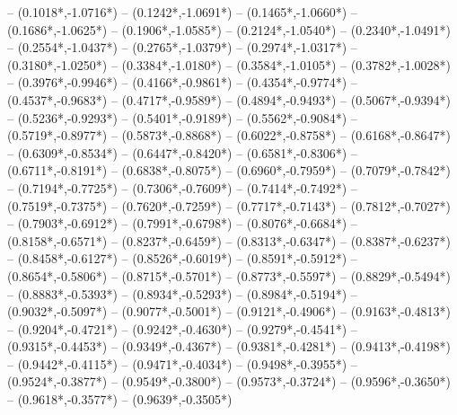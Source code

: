 {	-- ({0.1018*\dx},{-1.0716*\dy})
	-- ({0.1242*\dx},{-1.0691*\dy})
	-- ({0.1465*\dx},{-1.0660*\dy})
	-- ({0.1686*\dx},{-1.0625*\dy})
	-- ({0.1906*\dx},{-1.0585*\dy})
	-- ({0.2124*\dx},{-1.0540*\dy})
	-- ({0.2340*\dx},{-1.0491*\dy})
	-- ({0.2554*\dx},{-1.0437*\dy})
	-- ({0.2765*\dx},{-1.0379*\dy})
	-- ({0.2974*\dx},{-1.0317*\dy})
	-- ({0.3180*\dx},{-1.0250*\dy})
	-- ({0.3384*\dx},{-1.0180*\dy})
	-- ({0.3584*\dx},{-1.0105*\dy})
	-- ({0.3782*\dx},{-1.0028*\dy})
	-- ({0.3976*\dx},{-0.9946*\dy})
	-- ({0.4166*\dx},{-0.9861*\dy})
	-- ({0.4354*\dx},{-0.9774*\dy})
	-- ({0.4537*\dx},{-0.9683*\dy})
	-- ({0.4717*\dx},{-0.9589*\dy})
	-- ({0.4894*\dx},{-0.9493*\dy})
	-- ({0.5067*\dx},{-0.9394*\dy})
	-- ({0.5236*\dx},{-0.9293*\dy})
	-- ({0.5401*\dx},{-0.9189*\dy})
	-- ({0.5562*\dx},{-0.9084*\dy})
	-- ({0.5719*\dx},{-0.8977*\dy})
	-- ({0.5873*\dx},{-0.8868*\dy})
	-- ({0.6022*\dx},{-0.8758*\dy})
	-- ({0.6168*\dx},{-0.8647*\dy})
	-- ({0.6309*\dx},{-0.8534*\dy})
	-- ({0.6447*\dx},{-0.8420*\dy})
	-- ({0.6581*\dx},{-0.8306*\dy})
	-- ({0.6711*\dx},{-0.8191*\dy})
	-- ({0.6838*\dx},{-0.8075*\dy})
	-- ({0.6960*\dx},{-0.7959*\dy})
	-- ({0.7079*\dx},{-0.7842*\dy})
	-- ({0.7194*\dx},{-0.7725*\dy})
	-- ({0.7306*\dx},{-0.7609*\dy})
	-- ({0.7414*\dx},{-0.7492*\dy})
	-- ({0.7519*\dx},{-0.7375*\dy})
	-- ({0.7620*\dx},{-0.7259*\dy})
	-- ({0.7717*\dx},{-0.7143*\dy})
	-- ({0.7812*\dx},{-0.7027*\dy})
	-- ({0.7903*\dx},{-0.6912*\dy})
	-- ({0.7991*\dx},{-0.6798*\dy})
	-- ({0.8076*\dx},{-0.6684*\dy})
	-- ({0.8158*\dx},{-0.6571*\dy})
	-- ({0.8237*\dx},{-0.6459*\dy})
	-- ({0.8313*\dx},{-0.6347*\dy})
	-- ({0.8387*\dx},{-0.6237*\dy})
	-- ({0.8458*\dx},{-0.6127*\dy})
	-- ({0.8526*\dx},{-0.6019*\dy})
	-- ({0.8591*\dx},{-0.5912*\dy})
	-- ({0.8654*\dx},{-0.5806*\dy})
	-- ({0.8715*\dx},{-0.5701*\dy})
	-- ({0.8773*\dx},{-0.5597*\dy})
	-- ({0.8829*\dx},{-0.5494*\dy})
	-- ({0.8883*\dx},{-0.5393*\dy})
	-- ({0.8934*\dx},{-0.5293*\dy})
	-- ({0.8984*\dx},{-0.5194*\dy})
	-- ({0.9032*\dx},{-0.5097*\dy})
	-- ({0.9077*\dx},{-0.5001*\dy})
	-- ({0.9121*\dx},{-0.4906*\dy})
	-- ({0.9163*\dx},{-0.4813*\dy})
	-- ({0.9204*\dx},{-0.4721*\dy})
	-- ({0.9242*\dx},{-0.4630*\dy})
	-- ({0.9279*\dx},{-0.4541*\dy})
	-- ({0.9315*\dx},{-0.4453*\dy})
	-- ({0.9349*\dx},{-0.4367*\dy})
	-- ({0.9381*\dx},{-0.4281*\dy})
	-- ({0.9413*\dx},{-0.4198*\dy})
	-- ({0.9442*\dx},{-0.4115*\dy})
	-- ({0.9471*\dx},{-0.4034*\dy})
	-- ({0.9498*\dx},{-0.3955*\dy})
	-- ({0.9524*\dx},{-0.3877*\dy})
	-- ({0.9549*\dx},{-0.3800*\dy})
	-- ({0.9573*\dx},{-0.3724*\dy})
	-- ({0.9596*\dx},{-0.3650*\dy})
	-- ({0.9618*\dx},{-0.3577*\dy})
	-- ({0.9639*\dx},{-0.3505*\dy})
}
